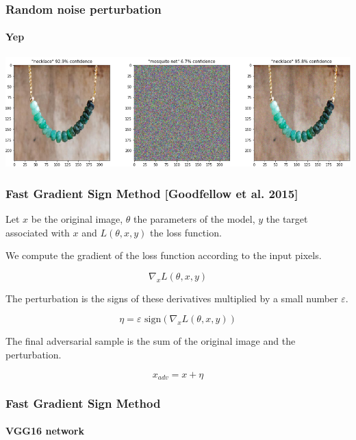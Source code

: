 \documentclass[9pt]{beamer}
\begin{document}
\begin{frame}
  \frametitle{Random noise perturbation}

  \framesubtitle{Yep}

  \begin{center}
    \includegraphics[width = \linewidth]{images/random_perturbation.png}
  \end{center}

\end{frame}

\begin{frame}
  \frametitle{Fast Gradient Sign Method [Goodfellow et al. 2015]}

  Let $x$ be the original image, $\theta$ the parameters of the model,
  $y$ the target associated with $x$ and $L(\theta, x, y)$ the loss
  function.

  \bigskip

  We compute the gradient of the loss function according to the input
  pixels.

  \[
  \nabla_{x} L(\theta, x, y)
  \]

  \bigskip

  The perturbation is the signs of these derivatives multiplied by a
  small number $\varepsilon$.

  \[
  \eta = \varepsilon \text{ sign}(\nabla_{x} L(\theta, x, y))
  \]

  \bigskip

  The final adversarial sample is the sum of the original image and
  the perturbation.

  \[
  x_{adv} = x + \eta
  \]

\end{frame}

\begin{frame}
  \frametitle{Fast Gradient Sign Method}

  \framesubtitle{\textbf{VGG16} network}

  \begin{center}
    
  \end{center}
\end{frame}
\end{document}
